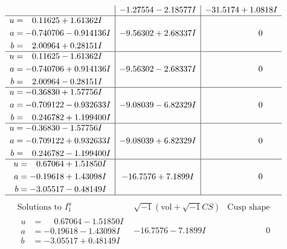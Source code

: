 \documentclass[1p]{elsarticle_modified}
\theoremstyle{definition}
\newcommand{\I}{\sqrt{-1}}
\begin{document}
$$\begin{array}{c|c|c}
 & -1.27554 - 2.18577 I & -31.5174 + 1.0818 I \\ \hline\begin{aligned}
u &= \phantom{-}0.11625 + 1.61362 I \\
a &= -0.740706 - 0.914136 I \\
b &= \phantom{-}2.00964 + 0.28151 I\end{aligned}
 & -9.56302 + 2.68337 I & \phantom{-0.000000 } 0 \\ \hline\begin{aligned}
u &= \phantom{-}0.11625 - 1.61362 I \\
a &= -0.740706 + 0.914136 I \\
b &= \phantom{-}2.00964 - 0.28151 I\end{aligned}
 & -9.56302 - 2.68337 I & \phantom{-0.000000 } 0 \\ \hline\begin{aligned}
u &= -0.36830 + 1.57756 I \\
a &= -0.709122 - 0.932633 I \\
b &= \phantom{-}0.246782 + 1.199400 I\end{aligned}
 & -9.08039 - 6.82329 I & \phantom{-0.000000 } 0 \\ \hline\begin{aligned}
u &= -0.36830 - 1.57756 I \\
a &= -0.709122 + 0.932633 I \\
b &= \phantom{-}0.246782 - 1.199400 I\end{aligned}
 & -9.08039 + 6.82329 I & \phantom{-0.000000 } 0 \\ \hline\begin{aligned}
u &= \phantom{-}0.67064 + 1.51850 I \\
a &= -0.19618 + 1.43098 I \\
b &= -3.05517 - 0.48149 I\end{aligned}
 & -16.7576 + 7.1899 I & \phantom{-0.000000 } 0\\
 \hline 
 \end{array}$$\newpage$$\begin{array}{c|c|c}  
\text{Solutions to }I^u_{1}& \I (\text{vol} + \sqrt{-1}CS) & \text{Cusp shape}\\
 \hline 
\begin{aligned}
u &= \phantom{-}0.67064 - 1.51850 I \\
a &= -0.19618 - 1.43098 I \\
b &= -3.05517 + 0.48149 I\end{aligned}
 & -16.7576 - 7.1899 I & \phantom{-0.000000 } 0 \\ \hline\begin{aligned}

\end{aligned}
\end{array}$$
\end{document}
